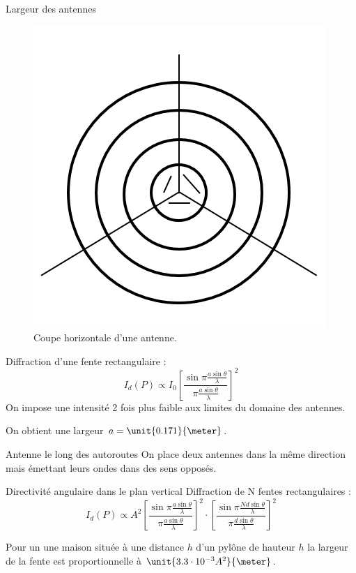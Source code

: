 \documentclass[pdf]{beamer}
\begin{document}
\begin{frame}{Largeur des antennes}
	\begin{figure}[ht!] 
		\centering  
		\includegraphics[scale=0.30]{antennes.png}  
		\caption{Coupe horizontale d'une antenne.}  
	\end{figure}  
 	
	Diffraction d'une fente rectangulaire :
	$$I_d (P) \propto I_0 \left[\frac{\sin\pi\frac{a\sin\theta}{\lambda}}{\pi\frac{a\sin\theta}{\lambda}}\right]^2$$
	On impose une intensité 2 fois plus faible aux limites du domaine des antennes.

	On obtient une largeur $a = \unit{0.171}{\meter}$.
\end{frame}

\begin{frame}{Antenne le long des autoroutes}
	On place deux antennes dans la même direction mais émettant leurs ondes dans des sens opposés.
\end{frame}

\begin{frame}{Directivité angulaire dans le plan vertical}
	Diffraction de N fentes rectangulaires :
	$$I_d (P)\propto A^2 \left[\frac{\sin \pi \frac{a \sin \theta}{\lambda}}{\pi \frac{a \sin \theta}{\lambda}}\right]^2  
	\cdot \left[  \frac{\sin \pi \frac{N d \sin \theta}{\lambda}}{\pi \frac{d \sin \theta}{\lambda}}\right]^2$$

	Pour un une maison située à une distance $h$ d'un pylône de hauteur $h$ la largeur de la fente est proportionnelle à $\unit{3.3 \cdot 10^{-3}A^2}{\meter}$.
\end{frame}
\end{document}
